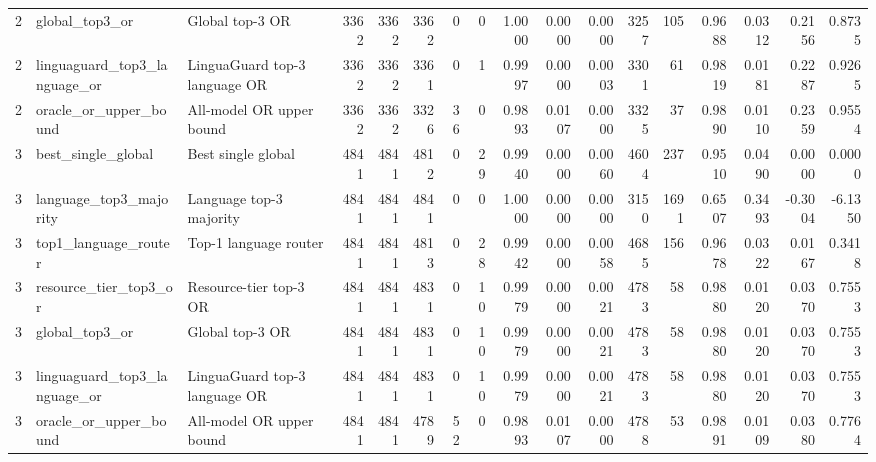 \begin{tabular}{rllrrrrrrrrrrrrrr}
2 & global\_top3\_or & Global top-3 OR & 3362 & 3362 & 3362 & 0 & 0 & 1.0000 & 0.0000 & 0.0000 & 3257 & 105 & 0.9688 & 0.0312 & 0.2156 & 0.8735 \\
2 & linguaguard\_top3\_language\_or & LinguaGuard top-3 language OR & 3362 & 3362 & 3361 & 0 & 1 & 0.9997 & 0.0000 & 0.0003 & 3301 & 61 & 0.9819 & 0.0181 & 0.2287 & 0.9265 \\
2 & oracle\_or\_upper\_bound & All-model OR upper bound & 3362 & 3362 & 3326 & 36 & 0 & 0.9893 & 0.0107 & 0.0000 & 3325 & 37 & 0.9890 & 0.0110 & 0.2359 & 0.9554 \\
3 & best\_single\_global & Best single global & 4841 & 4841 & 4812 & 0 & 29 & 0.9940 & 0.0000 & 0.0060 & 4604 & 237 & 0.9510 & 0.0490 & 0.0000 & 0.0000 \\
3 & language\_top3\_majority & Language top-3 majority & 4841 & 4841 & 4841 & 0 & 0 & 1.0000 & 0.0000 & 0.0000 & 3150 & 1691 & 0.6507 & 0.3493 & -0.3004 & -6.1350 \\
3 & top1\_language\_router & Top-1 language router & 4841 & 4841 & 4813 & 0 & 28 & 0.9942 & 0.0000 & 0.0058 & 4685 & 156 & 0.9678 & 0.0322 & 0.0167 & 0.3418 \\
3 & resource\_tier\_top3\_or & Resource-tier top-3 OR & 4841 & 4841 & 4831 & 0 & 10 & 0.9979 & 0.0000 & 0.0021 & 4783 & 58 & 0.9880 & 0.0120 & 0.0370 & 0.7553 \\
3 & global\_top3\_or & Global top-3 OR & 4841 & 4841 & 4831 & 0 & 10 & 0.9979 & 0.0000 & 0.0021 & 4783 & 58 & 0.9880 & 0.0120 & 0.0370 & 0.7553 \\
3 & linguaguard\_top3\_language\_or & LinguaGuard top-3 language OR & 4841 & 4841 & 4831 & 0 & 10 & 0.9979 & 0.0000 & 0.0021 & 4783 & 58 & 0.9880 & 0.0120 & 0.0370 & 0.7553 \\
3 & oracle\_or\_upper\_bound & All-model OR upper bound & 4841 & 4841 & 4789 & 52 & 0 & 0.9893 & 0.0107 & 0.0000 & 4788 & 53 & 0.9891 & 0.0109 & 0.0380 & 0.7764 \\
\bottomrule
\end{tabular}
